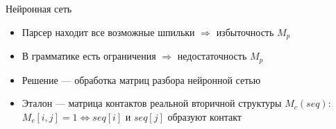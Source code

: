 \documentclass{beamer}
\begin{document}
\begin{frame}{Нейронная сеть}
\begin{itemize}
    \item Парсер находит все возможные шпильки $\Rightarrow$ избыточность $M_p$
    \item В грамматике есть ограничения $\Rightarrow$ недостаточность $M_p$
    \item Решение --- обработка матриц разбора нейронной сетью
    \item Эталон --- матрица контактов реальной вторичной структуры $M_c(seq)$: $M_c[i,j]=1 \iff seq[i]$ и $seq[j]$ образуют контакт
\end{itemize}

\vspace{3mm}

\captionsetup[subfigure]{justification=centering}
\setlength{\fboxsep}{0pt}
\begin{figure}[h]
    \centering
    \begin{subfigure}{.33\textwidth}
        \centering
        \vspace{-3.5mm}
        \begin{overprint}

\end{overprint}
\end{subfigure}
\end{figure}
\end{frame}
\end{document}
